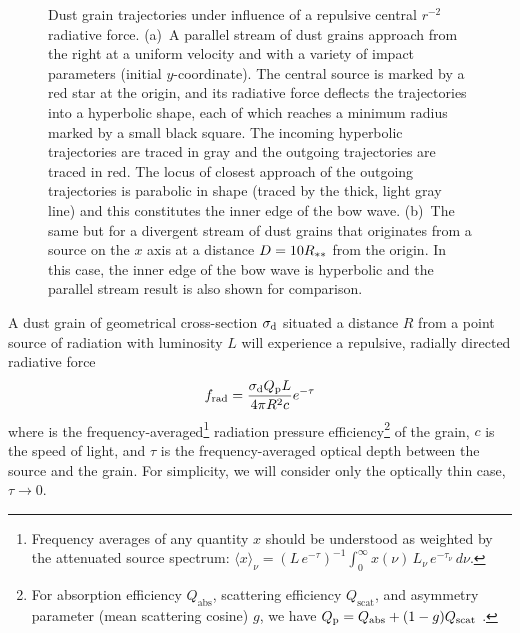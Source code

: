 \begin{figure}
  \caption[Dust grain trajectories]{Dust grain trajectories under
    influence of a repulsive central \(r^{-2}\) radiative force.
    (a)~A parallel stream of dust grains approach from the right at a
    uniform velocity and with a variety of impact parameters (initial
    \(y\)-coordinate). The central source is marked by a red star at
    the origin, and its radiative force deflects the trajectories into
    a hyperbolic shape, each of which reaches a minimum radius marked
    by a small black square.  The incoming hyperbolic trajectories are
    traced in gray and the outgoing trajectories are traced in red.
    The locus of closest approach of the outgoing trajectories is
    parabolic in shape (traced by the thick, light gray line) and this
    constitutes the inner edge of the bow wave.  (b)~The same but for
    a divergent stream of dust grains that originates from a source on
    the \(x\) axis at a distance \(D = 10 R_{**}\) from the origin.  In
    this case, the inner edge of the bow wave is hyperbolic and the
    parallel stream result is also shown for comparison.}
  \label{fig:dust-trajectories}
\end{figure}



A dust grain of geometrical cross-section \(\sigma_{\text{d}}\) situated a
distance \(R\) from a point source of radiation with luminosity \(L\)
will experience a repulsive, radially directed radiative force
\citep[e.g.,][]{Spitzer:1978a}
\begin{equation}
  \label{eq:dust-rad-force}
  f_{\text{rad}} = \frac{\sigma_{\text{d}} Q_{\text{p}} L} {4 \pi R^2 c} e^{-\tau}
\end{equation}
where \Qp{} is the frequency-averaged\footnote{%
  Frequency averages of any quantity \(x\) should be understood as
  weighted by the attenuated source spectrum:
  \(\langle x \rangle_\nu = (L \, e^{-\tau})^{-1} \int_0^\infty x(\nu)\, L_\nu \, e^{-\tau_\nu} \, d\nu
  \).  } %
radiation pressure efficiency\footnote{%
  \label{fn:Qp}
  For absorption efficiency \(Q_{\text{abs}}\), scattering efficiency
  \(Q_{\text{scat}}\), and asymmetry parameter (mean scattering
  cosine) \(g\), we have
  \(Q_{\text{p}} = Q_{\text{abs}} + (1 - g) Q_{\text{scat}}\)
  \citep[e.g., \S~4.5 of][]{Bohren:1983a}.} %
of the grain, \(c\) is the speed of light, and \(\tau\) is the
frequency-averaged optical depth between the source and the grain.
For simplicity, we will consider only the optically thin case,
\(\tau \to 0\).



